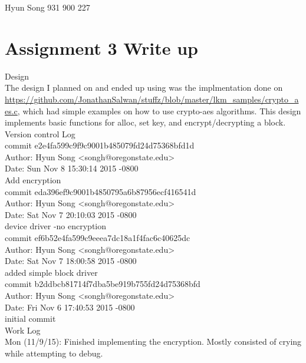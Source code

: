 \documentclass[letterpaper,10pt]{article}
\begin{document}
Hyun Song
931 900 227

\section{Assignment 3 Write up}
{\LARGE Design}\\
The design I planned on and ended up using was the implmentation done on \url{https://github.com/JonathanSalwan/stuffz/blob/master/lkm_samples/crypto_aes.c}, which had simple examples on how to use crypto-aes algorithms. This design implements basic functions for alloc, set key, and encrypt/decrypting a block.\\

{\LARGE Version control Log}\\

commit e2e4fa599c9f9c9001b485079fd24d75368bfd1d\\
Author: Hyun Song <songh@oregonstate.edu>\\
Date:   Sun Nov 8 15:30:14 2015 -0800\\

    Add encryption\\

commit eda396ef9c9001b4850795a6b87956ecf416541d\\
Author: Hyun Song <songh@oregonstate.edu>\\
Date:   Sat Nov 7 20:10:03 2015 -0800\\

    device driver -no encryption\\

commit ef6b52e4fa599c9eeea7dc18a1f4fac6c40625dc\\
Author: Hyun Song <songh@oregonstate.edu>\\
Date:   Sat Nov 7 18:00:58 2015 -0800\\

    added simple block driver\\

commit b2ddbcb81714f7dba5be919b755fd24d75368bfd\\
Author: Hyun Song <songh@oregonstate.edu>\\
Date:   Fri Nov 6 17:40:53 2015 -0800\\

    initial commit\\

{\LARGE Work Log}\\

Mon (11/9/15): Finished implementing the encryption. Mostly consisted of crying while attempting to debug.\\
\end{document}
